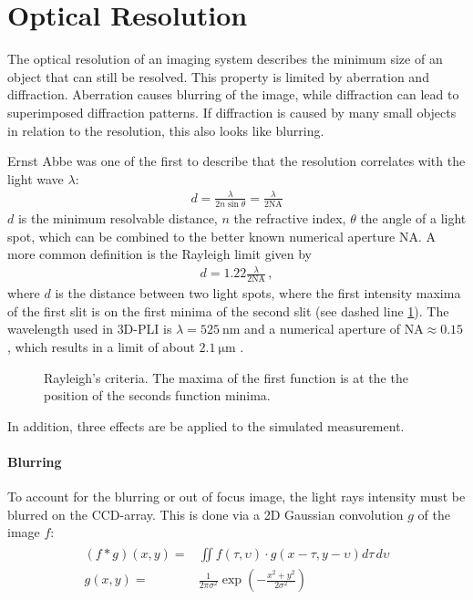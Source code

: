 \section{Optical Resolution}
\label{sec:opticalResolution}
%
The optical resolution of an imaging system describes the minimum size of an object that can still be resolved.
This property is limited by aberration and diffraction.
Aberration causes blurring of the image, while diffraction can lead to superimposed diffraction patterns.
If diffraction is caused by many small objects in relation to the resolution, this also looks like blurring.
\par
%
Ernst Abbe was one of the first to describe that the resolution correlates with the light wave $\lambda$:
\begin{align}
d=\frac{ \lambda}{2 n \sin \theta} = \frac{\lambda}{2\mathrm{NA}} 
\end{align}
$d$ is the minimum resolvable distance, $n$ the refractive index, $\theta$ the angle of a light spot, which can be combined to the better known numerical aperture $\mathrm{NA}$.
A more common definition is the Rayleigh limit given by
\begin{align}
d=1.22\frac{\lambda}{2\mathrm{NA}} \, ,
\end{align}
where $d$ is the distance between two light spots, where the first intensity maxima of the first slit is on the first minima of the second slit (see dashed line \cref{fig:rayleigh}).
The wavelength used in \ac{3D-PLI} is $\lambda = \SI{525}{\nano\meter}$ and a numerical aperture of $\mathrm{NA} \approx \SI{0.15}{}$, which results in a limit of about $\SI{2.1}{\micro\meter}$ \cite{MenzelDissertation}.
%
\begin{figure}[!t]
\setlength{\tikzwidth}{0.5\textwidth}
\centering
\caption[]{Rayleigh's criteria. The maxima of the first function is at the the position of the seconds function minima.}
\label{fig:rayleigh}
\end{figure}
%
In addition, three effects are be applied to the simulated measurement.
%
\paragraph{Blurring}
To account for the blurring or out of focus image, the light rays intensity must be blurred on the \ac{CCD}-array.
This is done via a 2D Gaussian convolution $g$ of the image $f$:
\begin{align}
\begin{split}
    (f * g)(x,y) =& \iint f(\tau,\upsilon) \cdot g(x-\tau, y-\upsilon)d\tau \, d\upsilon\\
    g(x,y) =& \frac{1}{2\pi\sigma^2} \exp\left(-\frac{x^2+y^2}{2\sigma^2}\right)
\end{split}
\end{align}
%
